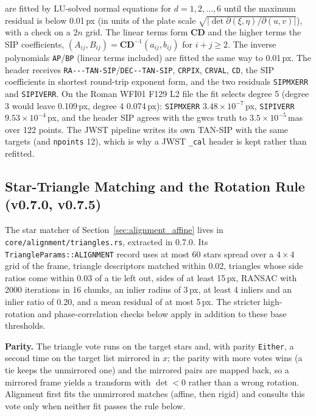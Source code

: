 \documentclass[11pt,a4paper]{article}
\newcommand{\code}[1]{\texttt{\small #1}}
\newcommand{\mat}[1]{\mathbf{#1}}
\begin{document}
    are fitted by LU-solved normal equations for $d = 1, 2, \ldots, 6$ until the maximum residual is below 0.01\,px (in units of the plate scale $\sqrt{|\det \partial(\xi,\eta)/\partial(u,v)|}$), with a check on a $2n$ grid. The linear terms form $\mat{CD}$ and the higher terms the SIP coefficients, $(A_{ij}, B_{ij}) = \mat{CD}^{-1}(a_{ij}, b_{ij})$ for $i + j \ge 2$. The inverse polynomials \code{AP}/\code{BP} (linear terms included) are fitted the same way to 0.01\,px. The header receives \code{RA-{}-{}-TAN-SIP}/\code{DEC-{}-TAN-SIP}, \code{CRPIX}, \code{CRVAL}, \code{CD}, the SIP coefficients in shortest round-trip exponent form, and the two residuals \code{SIPMXERR} and \code{SIPIVERR}. On the Roman WFI01 F129 L2 file the fit selects degree 5 (degree 3 would leave 0.109\,px, degree 4 0.074\,px): \code{SIPMXERR} $3.48 \times 10^{-7}$\,px, \code{SIPIVERR} $9.53 \times 10^{-4}$\,px, and the header SIP agrees with the gwcs truth to $3.5 \times 10^{-5}$\,mas over 122 points. The JWST pipeline writes its own TAN-SIP with the same targets (and \code{npoints} 12), which is why a JWST \code{\_cal} header is kept rather than refitted.

    \subsection{Star-Triangle Matching and the Rotation Rule (v0.7.0, v0.7.5)}
    \label{sec:triangles_math}

    The star matcher of Section~\ref{sec:alignment_affine} lives in \code{core/alignment/triangles.rs}, extracted in 0.7.0. Its \code{TriangleParams::ALIGNMENT} record uses at most 60 stars spread over a $4 \times 4$ grid of the frame, triangle descriptors matched within 0.02, triangles whose side ratios come within 0.03 of a tie left out, sides of at least 15\,px, RANSAC with 2000 iterations in 16 chunks, an inlier radius of 3\,px, at least 4 inliers and an inlier ratio of 0.20, and a mean residual of at most 5\,px. The stricter high-rotation and phase-correlation checks below apply in addition to these base thresholds.

    \textbf{Parity.} The triangle vote runs on the target stars and, with parity \code{Either}, a second time on the target list mirrored in $x$; the parity with more votes wins (a tie keeps the unmirrored one) and the mirrored pairs are mapped back, so a mirrored frame yields a transform with $\det < 0$ rather than a wrong rotation. Alignment first fits the unmirrored matches (affine, then rigid) and consults this vote only when neither fit passes the rule below.
\end{document}
